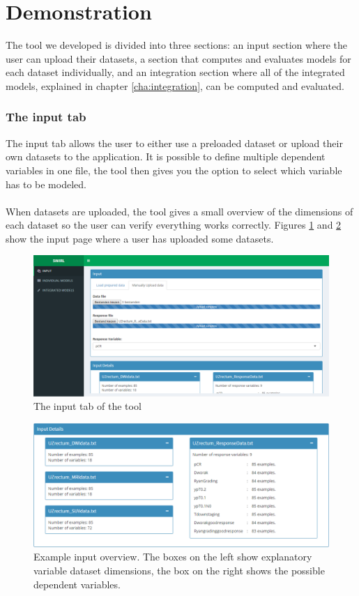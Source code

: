 \section{Demonstration}
\label{sec:tool-demonstration}
The tool we developed is divided into three sections: an input section where the user can upload their datasets, a section that computes and evaluates models for each dataset individually, and an integration section where all of the integrated models, explained in chapter \ref{cha:integration}, can be computed and evaluated.
\subsubsection{The input tab}
The input tab allows the user to either use a preloaded dataset or upload their own datasets to the application. It is possible to define multiple dependent variables in one file, the tool then gives you the option to select which variable has to be modeled. \\ \\
When datasets are uploaded, the tool gives a small overview of the dimensions of each dataset so the user can verify everything works correctly. Figures \ref{fig:tool-input} and \ref{fig:tool-input2} show the input page where a user has uploaded some datasets.
\begin{figure}
	\centering
	\includegraphics[scale=.3]{images/tool_input_1}
	\caption{The input tab of the tool}
	\label{fig:tool-input}
\end{figure}
\begin{figure}
	\centering
	\includegraphics[scale=.4]{images/tool_input_overview}
	\caption{Example input overview. The boxes on the left show explanatory variable dataset dimensions, the box on the right shows the possible dependent variables.}
	\label{fig:tool-input2}
\end{figure}
